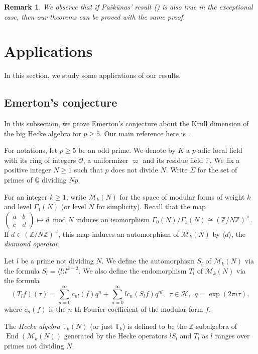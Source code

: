 \documentclass[a4paper, 12pt]{amsart}
\newtheorem{rem}[thm]{\bf Remark}
\DeclareMathOperator{\End}{End}
\DeclareMathOperator{\modd}{mod}
\newcommand{\Z}{\mathbb{Z}}
\newcommand{\F}{\mathbb{F}}
\newcommand{\Q}{\mathbb{Q}}
\newcommand{\T}{\mathbb{T}}
\newcommand{\cO}{\mathcal{O}}
\begin{document}
    \begin{rem}
    	We observe that if Pašk\=unas' result (\cite[Corollary 5.13]{Paskunas_2021}) is also true in the exceptional case, then our theorems can be proved with the same proof.
    \end{rem}
    
    \section{Applications}
    In this section, we study some applications of our results.
    
    \subsection{Emerton's conjecture}\label{emerton's conj}
   In this subsection, we prove Emerton's conjecture about the Krull dimension of the big Hecke algebra for $p \ge 5$. Our main reference here is \cite{Emerton2011}.
   
   For notations, let $p \ge 5$ be an odd prime. We denote by $K$  a $p$-adic local field with its ring of integers $\cO$, a uniformizer $\varpi$ and its residue field $\F$. We fix a positive integer $N \ge 1$ such that $p$ does not divide $N$. Write $\Sigma$ for the set of primes of $\Q$ dividing $Np$.
   
    For an integer $k \ge 1 $, write $\mathcal{M}_k(N)$ for the space of modular forms of weight $k$ and level $\Gamma_1(N)$ (or level $N$ for simplicity). Recall that the map $\begin{pmatrix}
    	a & b\\
    	c& d
    \end{pmatrix}  \mapsto d~ \modd N$ induces an isomorphism $ \Gamma_0(N)/\Gamma_1(N) \cong (\Z/N\Z)^\times$. If $d \in (\Z/N\Z)^\times$, this map induces an automorphism of $\mathcal{M}_k(N)$ by $\langle d \rangle$, the \textit{diamond operator}.
    
    Let $l$ be a prime not dividing $N$. We define the automorphism $S_l$ of $\mathcal{M}_k(N)$ via the formula $S_l = \langle l \rangle l^{k-2}$. We also define the endomorphism $T_l$ of  $\mathcal{M}_k(N)$ via the formula 
    $$ (T_l f)(\tau)= \sum_{n=0}^{\infty} c_{nl}(f)q^n + \sum_{n=0}^{\infty} l c_n(S_lf)q^{nl},~~ \tau \in \mathcal{H},~~ q=\exp(2\pi i \tau),$$
    where $c_n(f)$ is the $n$-th Fourier coefficient of the modular form $f$.
    
    The \textit{Hecke algebra} $\T_k(N)$ (or just $\T_k$) is defined to be the $\Z$-subalgebra of $\End(\mathcal{M}_k(N))$ generated by the Hecke operators $lS_l$ and $T_l$ as $l$ ranges over primes not dividing $N$.
    
\end{document}
